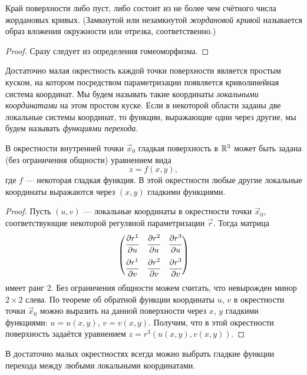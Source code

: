 \begin{proposition}
	Край поверхности либо пуст, либо состоит из не более чем счётного числа жордановых кривых. (Замкнутой или незамкнутой \textit{жордановой кривой} называется образ вложения окружности или отрезка, соответственно.)
\end{proposition}

\begin{proof}
	Сразу следует из определения гомеоморфизма.
\end{proof}

Достаточно малая окрестность каждой точки поверхности является простым куском, на котором посредством параметризации появляется криволинейная система координат. Мы будем называть такие координаты \textit{локальными координатами} на этом простом куске. Если в некоторой области заданы две локальные системы координат, то функции, выражающие одни через другие, мы будем называть \textit{функциями перехода}.

\begin{proposition} \label{proposition:SurfaceGraph}
	В окрестности внутренней точки $\vec{x}_0$ гладкая поверхность в $\mathbb{R}^3$ может быть задана (без ограничения общности) уравнением вида
	\[
		z = f(x, y),
	\]
	где $f$ --- некоторая гладкая функция. В этой окрестности любые другие локальные координаты выражаются через $(x, y)$ гладкими функциями.
\end{proposition}

\begin{proof}
	Пусть $(u, v)$ --- локальные координаты в окрестности точки $\vec{x}_0$, соответствующие некоторой регуляной параметризации $\vec{r}$. Тогда матрица
	\[
		\begin{pmatrix}
			\cfrac{\partial r^1}{\partial u} & \cfrac{\partial r^2}{\partial u} & \cfrac{\partial r^3}{\partial u}\\[1em]
			\cfrac{\partial r^1}{\partial v} & \cfrac{\partial r^2}{\partial v} & \cfrac{\partial r^3}{\partial v}
		\end{pmatrix}
	\]
	имеет ранг $2$. Без ограничения общности можем считать, что невырожден минор $2 \times 2$ слева. По теореме об обратной функции координаты $u$, $v$ в окрестности точки $\vec{x}_0$ можно выразить на данной поверхности через $x$, $y$ гладкими функциями: $u = u(x, y)$, $v = v(x, y)$. Получим, что в этой окрестности поверхность задаётся уравнением $z = r^3(u(x, y), v(x, y))$.
\end{proof}

\begin{lemma} \label{lemma:SmoothLocal}
	В достаточно малых окрестностях всегда можно выбрать гладкие функции перехода между любыми локальными координатами.
\end{lemma}

